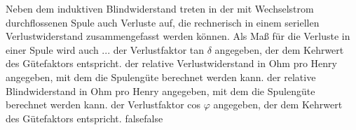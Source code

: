     {Neben dem induktiven Blindwiderstand treten in der mit Wechselstrom durchflossenen Spule auch Verluste auf, die rechnerisch in einem seriellen Verlustwiderstand zusammengefasst werden können. Als Maß für die Verluste in einer Spule wird auch ...}
    {der Verlustfaktor tan $\delta$ angegeben, der dem Kehrwert des Gütefaktors entspricht.}
    {der relative Verlustwiderstand in Ohm pro Henry angegeben, mit dem die Spulengüte berechnet werden kann.}
    {der relative Blindwiderstand in Ohm pro Henry angegeben, mit dem die Spulengüte berechnet werden kann.}
    {der Verlustfaktor cos $\varphi$ angegeben, der dem Kehrwert des Gütefaktors entspricht.}
    {false}{false}